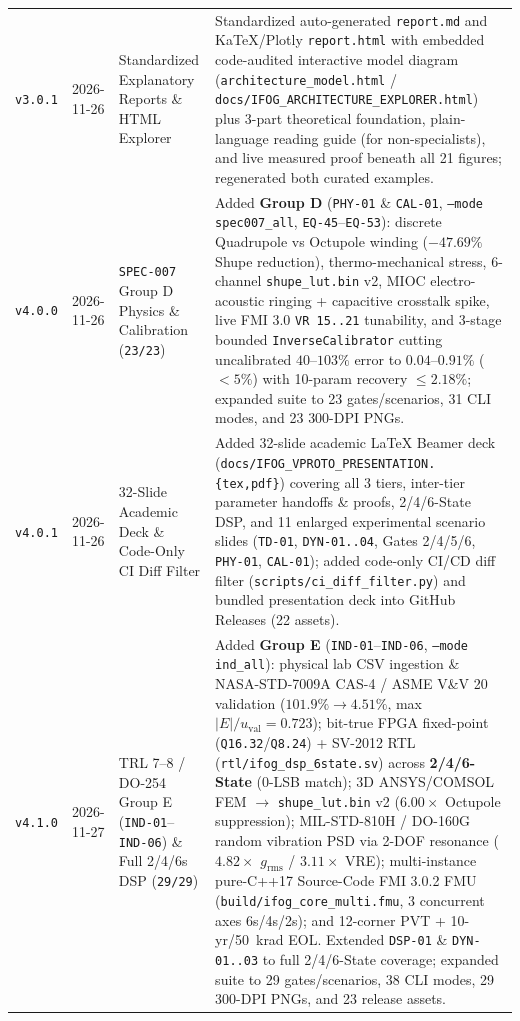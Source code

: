 \documentclass[11pt,a4paper]{article}
\begin{document}
\begin{tabularx}{\textwidth}{@{}p{1.4cm} p{2.0cm} p{3.3cm} X@{}}
\texttt{v3.0.1} & 2026-11-26 & Standardized Explanatory Reports \& HTML Explorer & Standardized auto-generated \texttt{report.md} and KaTeX/Plotly \texttt{report.html} with embedded code-audited interactive model diagram (\texttt{architecture\_model.html} / \texttt{docs/IFOG\_ARCHITECTURE\_EXPLORER.html}) plus 3-part theoretical foundation, plain-language reading guide (for non-specialists), and live measured proof beneath all 21 figures; regenerated both curated examples. \\
\texttt{v4.0.0} & 2026-11-26 & \texttt{SPEC-007} Group D Physics \& Calibration (\texttt{23/23}) & Added \textbf{Group D} (\texttt{PHY-01} \& \texttt{CAL-01}, \texttt{--mode spec007\_all}, \texttt{EQ-45}--\texttt{EQ-53}): discrete Quadrupole vs Octupole winding ($-47.69\%$ Shupe reduction), thermo-mechanical stress, 6-channel \texttt{shupe\_lut.bin} v2, MIOC electro-acoustic ringing + capacitive crosstalk spike, live FMI 3.0 \texttt{VR 15..21} tunability, and 3-stage bounded \texttt{InverseCalibrator} cutting uncalibrated $40$--$103\%$ error to $0.04$--$0.91\%$ ($<5\%$) with 10-param recovery $\le 2.18\%$; expanded suite to 23 gates/scenarios, 31 CLI modes, and 23 300-DPI PNGs. \\
\texttt{v4.0.1} & 2026-11-26 & 32-Slide Academic Deck \& Code-Only CI Diff Filter & Added 32-slide academic LaTeX Beamer deck (\texttt{docs/IFOG\_VPROTO\_PRESENTATION.\{tex,pdf\}}) covering all 3 tiers, inter-tier parameter handoffs \& proofs, 2/4/6-State DSP, and 11 enlarged experimental scenario slides (\texttt{TD-01}, \texttt{DYN-01..04}, Gates 2/4/5/6, \texttt{PHY-01}, \texttt{CAL-01}); added code-only CI/CD diff filter (\texttt{scripts/ci\_diff\_filter.py}) and bundled presentation deck into GitHub Releases (22 assets). \\
\texttt{v4.1.0} & 2026-11-27 & TRL 7--8 / DO-254 Group E (\texttt{IND-01}--\texttt{IND-06}) \& Full 2/4/6s DSP (\texttt{29/29}) & Added \textbf{Group E} (\texttt{IND-01}--\texttt{IND-06}, \texttt{--mode ind\_all}): physical lab CSV ingestion \& NASA-STD-7009A CAS-4 / ASME V\&V 20 validation ($101.9\% \to 4.51\%$, max $|E|/u_{\text{val}} = 0.723$); bit-true FPGA fixed-point (\texttt{Q16.32}/\texttt{Q8.24}) + SV-2012 RTL (\texttt{rtl/ifog\_dsp\_6state.sv}) across \textbf{2/4/6-State} (0-LSB match); 3D ANSYS/COMSOL FEM $\to$ \texttt{shupe\_lut.bin} v2 ($6.00\times$ Octupole suppression); MIL-STD-810H / DO-160G random vibration PSD via 2-DOF resonance ($4.82\times$ $g_{\text{rms}}$ / $3.11\times$ VRE); multi-instance pure-C++17 Source-Code FMI 3.0.2 FMU (\texttt{build/ifog\_core\_multi.fmu}, 3 concurrent axes 6s/4s/2s); and 12-corner PVT + 10-yr/50~krad EOL. Extended \texttt{DSP-01} \& \texttt{DYN-01..03} to full 2/4/6-State coverage; expanded suite to 29 gates/scenarios, 38 CLI modes, 29 300-DPI PNGs, and 23 release assets. \\
\bottomrule
\end{tabularx}
\normalsize
\end{document}
